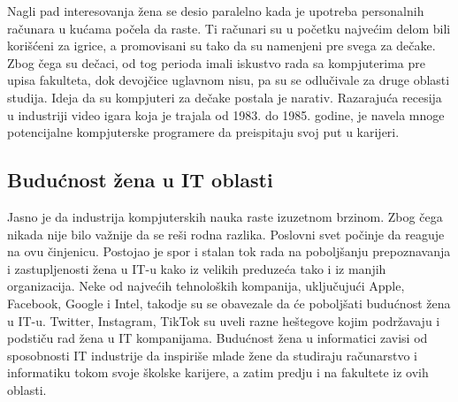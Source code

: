 \documentclass[a4paper,12pt]{article}
\begin{document}
Nagli pad interesovanja žena se desio paralelno kada je upotreba personalnih računara u kućama počela da raste. 
Ti računari su u početku najvećim delom bili korišćeni za igrice, a promovisani su tako da su namenjeni pre svega za dečake. 
Zbog čega su dečaci, od tog perioda imali iskustvo rada sa kompjuterima pre upisa fakulteta, dok devojčice uglavnom nisu, 
pa su se odlučivale za druge oblasti studija. Ideja da su kompjuteri za dečake postala je narativ. 
Razarajuća recesija u industriji video igara koja je trajala od 1983. do 1985. godine, je navela mnoge potencijalne 
kompjuterske programere da preispitaju svoj put u karijeri. 


\subsection{Budućnost žena u IT oblasti}
Jasno je da industrija kompjuterskih nauka raste izuzetnom brzinom. Zbog čega nikada nije bilo važnije da se reši rodna razlika.
Poslovni svet počinje da reaguje na ovu činjenicu. Postojao je spor i stalan tok rada na poboljšanju prepoznavanja i zastupljenosti
žena u IT-u kako iz velikih preduzeća tako i iz manjih organizacija. Neke od najvećih tehnoloških kompanija, uključujući Apple, 
Facebook, Google i Intel, takodje su se obavezale da će poboljšati budućnost žena u IT-u. Twitter, Instagram, TikTok su uveli razne 
heštegove kojim podržavaju i podstiču rad žena u IT kompanijama. Budućnost žena u informatici zavisi od sposobnosti IT industrije 
da inspiriše mlade žene da studiraju računarstvo i informatiku tokom svoje školske karijere, a zatim predju i na fakultete iz ovih oblasti.
\end{document}

